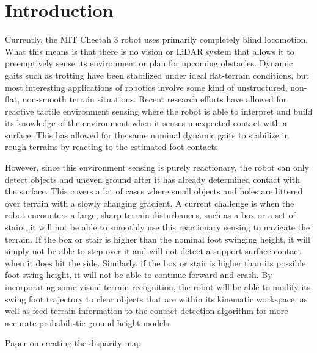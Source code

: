 
\section{Introduction}


Currently, the MIT Cheetah 3 robot uses primarily completely blind locomotion. What this means is that there is no vision or LiDAR system that allows it to preemptively sense its environment or plan for upcoming obstacles. Dynamic gaits such as trotting have been stabilized under ideal flat-terrain conditions, but most interesting applications of robotics involve some kind of unstructured, non-flat, non-smooth terrain situations. Recent research efforts have allowed for reactive tactile environment sensing where the robot is able to interpret and build its knowledge of the environment when it senses unexpected contact with a surface. This has allowed for the same nominal dynamic gaits to stabilize in rough terrains by reacting to the estimated foot contacts. 

However, since this environment sensing is purely reactionary, the robot can only detect objects and uneven ground after it has already determined contact with the surface. This covers a lot of cases where small objects and holes are littered over terrain with a slowly changing gradient. A current challenge is when the robot encounters a large, sharp terrain disturbances, such as a box or a set of stairs, it will not be able to smoothly use this reactionary sensing to navigate the terrain. If the box or stair is higher than the nominal foot swinging height, it will simply not be able to step over it and will not detect a support surface contact when it does hit the side. Similarly, if the box or stair is higher than its possible foot swing height, it will not be able to continue forward and crash. By incorporating some visual terrain recognition, the robot will be able to modify its swing foot trajectory to clear objects that are within its kinematic workspace, as well as feed terrain information to the contact detection algorithm for more accurate probabilistic ground height models.





Paper on creating the disparity map \cite{1467526} 